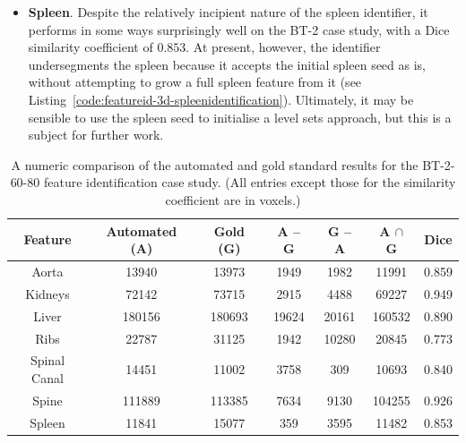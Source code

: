 \begin{itemize}
\item \textbf{Spleen}. Despite the relatively incipient nature of the spleen identifier, it performs in some ways surprisingly well on the BT-2 case study, with a Dice similarity coefficient of $0.853$. At present, however, the identifier undersegments the spleen because it accepts the initial spleen seed as is, without attempting to grow a full spleen feature from it (see Listing~\ref{code:featureid-3d-spleenidentification}). Ultimately, it may be sensible to use the spleen seed to initialise a level sets approach, but this is a subject for further work.

\end{itemize}

\begin{table}[p]
\begin{center}
\begin{tabular}{c|cccccc}
\footnotesize \textbf{Feature} & \footnotesize \textbf{Automated (A)} & \footnotesize \textbf{Gold (G)} & \footnotesize \textbf{A -- G} & \footnotesize \textbf{G -- A} & \footnotesize \textbf{A $\cap$ G} & \footnotesize \textbf{Dice} \\
\hline
\footnotesize Aorta & \footnotesize 13940 & \footnotesize 13973 & \footnotesize 1949 & \footnotesize 1982 & \footnotesize 11991 & \footnotesize 0.859 \\
\footnotesize Kidneys & \footnotesize 72142 & \footnotesize 73715 & \footnotesize 2915 & \footnotesize 4488 & \footnotesize 69227 & \footnotesize 0.949 \\
\footnotesize Liver & \footnotesize 180156 & \footnotesize 180693 & \footnotesize 19624 & \footnotesize 20161 & \footnotesize 160532 & \footnotesize 0.890 \\
\footnotesize Ribs & \footnotesize 22787 & \footnotesize 31125 & \footnotesize 1942 & \footnotesize 10280 & \footnotesize 20845 & \footnotesize 0.773 \\
\footnotesize Spinal Canal & \footnotesize 14451 & \footnotesize 11002 & \footnotesize 3758 & \footnotesize 309 & \footnotesize 10693 & \footnotesize 0.840 \\
\footnotesize Spine & \footnotesize 111889 & \footnotesize 113385 & \footnotesize 7634 & \footnotesize 9130 & \footnotesize 104255 & \footnotesize 0.926 \\
\footnotesize Spleen & \footnotesize 11841 & \footnotesize 15077 & \footnotesize 359 & \footnotesize 3595 & \footnotesize 11482 & \footnotesize 0.853 \\
\end{tabular}
\end{center}
\caption{A numeric comparison of the automated and gold standard results for the BT-2-60-80 feature identification case study. (All entries except those for the similarity coefficient are in voxels.)}
\label{tbl:validation-BT-2-60-80}
\end{table}

